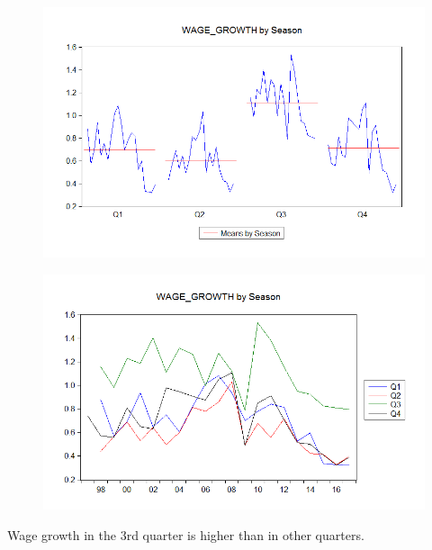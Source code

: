 \documentclass[12pt]{report}
\begin{document}
\begin{figure}[H]
	\centerline{\includegraphics{wageseasongraph}}
\end{figure}
\vspace{-\baselineskip}
\begin{figure}[H]
	\centerline{\includegraphics{multipleoverlaylines}}
\end{figure}
\vspace{-\baselineskip}

\noindent Wage growth in the 3rd quarter is higher than in other quarters.
\end{document}
